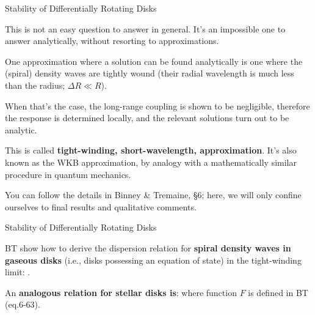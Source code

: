 \documentclass[letterpaper,landscape]{slides}
\begin{document}
\begin{slide}

\begin{center}
{\large \color{red} 
                 Stability of Differentially Rotating Disks }
\end{center}

This is not an easy question to answer in general. It's an impossible
one to answer analytically, without resorting to approximations.

One approximation where a solution can be found analytically is one
where the (spiral) density waves are tightly wound (their radial
wavelength is much less than the radius; $\Delta R \ll R$).

When that's the case, the long-range coupling is shown to be negligible,
therefore the response is determined locally, and the relevant solutions
turn out to be analytic.

This is called {\bf tight-winding, short-wavelength, approximation}. It's
also known as the WKB approximation, by analogy with a mathematically
similar procedure in quantum mechanics.

You can follow the details in Binney \& Tremaine, \S 6; here, we will
only confine ourselves to final results and qualitative comments.

\end{slide}

\begin{slide}

\begin{center}
{\large \color{red} 
                 Stability of Differentially Rotating Disks }
\end{center}

BT show how to derive the dispersion relation for {\bf spiral density
waves in gaseous disks} (i.e., disks possessing an equation of state)
in the tight-winding limit:
.

An {\bf analogous relation for stellar disks is}:
where function $F$ is defined in BT (eq.6-63).

\end{slide}
\end{document}
